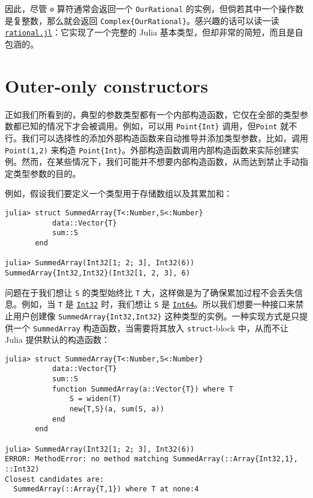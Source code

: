 因此，尽管 \texttt{⊘} 算符通常会返回一个 \texttt{OurRational} 的实例，但倘若其中一个操作数是复整数，那么就会返回 \texttt{Complex\{OurRational\}}。感兴趣的话可以读一读 \href{https://github.com/JuliaLang/julia/blob/master/base/rational.jl}{\texttt{rational.jl}}：它实现了一个完整的 Julia 基本类型，但却非常的简短，而且是自包涵的。



\hypertarget{11047482593881141721}{}


\section{Outer-only constructors}



正如我们所看到的，典型的参数类型都有一个内部构造函数，它仅在全部的类型参数都已知的情况下才会被调用。例如，可以用 \texttt{Point\{Int\}} 调用，但\texttt{Point} 就不行。我们可以选择性的添加外部构造函数来自动推导并添加类型参数，比如，调用 \texttt{Point(1,2)} 来构造 \texttt{Point\{Int\}}。外部构造函数调用内部构造函数来实际创建实例。然而，在某些情况下，我们可能并不想要内部构造函数，从而达到禁止手动指定类型参数的目的。



例如，假设我们要定义一个类型用于存储数组以及其累加和：




\begin{verbatim}
julia> struct SummedArray{T<:Number,S<:Number}
           data::Vector{T}
           sum::S
       end

julia> SummedArray(Int32[1; 2; 3], Int32(6))
SummedArray{Int32,Int32}(Int32[1, 2, 3], 6)
\end{verbatim}



问题在于我们想让 \texttt{S} 的类型始终比 \texttt{T} 大，这样做是为了确保累加过程不会丢失信息。例如，当 \texttt{T} 是 \hyperlink{10103694114785108551}{\texttt{Int32}} 时，我们想让 \texttt{S} 是 \hyperlink{7720564657383125058}{\texttt{Int64}}。所以我们想要一种接口来禁止用户创建像 \texttt{SummedArray\{Int32,Int32\}} 这种类型的实例。一种实现方式是只提供一个 \texttt{SummedArray} 构造函数，当需要将其放入 \texttt{struct}-block 中，从而不让 Julia 提供默认的构造函数：




\begin{verbatim}
julia> struct SummedArray{T<:Number,S<:Number}
           data::Vector{T}
           sum::S
           function SummedArray(a::Vector{T}) where T
               S = widen(T)
               new{T,S}(a, sum(S, a))
           end
       end

julia> SummedArray(Int32[1; 2; 3], Int32(6))
ERROR: MethodError: no method matching SummedArray(::Array{Int32,1}, ::Int32)
Closest candidates are:
  SummedArray(::Array{T,1}) where T at none:4
\end{verbatim}



